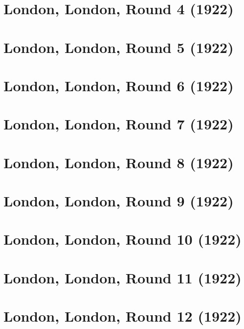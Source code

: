 \documentclass[11pt]{article}
\begin{document}
\clearpage

\section{London, London, Round 4 (1922)}


\clearpage

\section{London, London, Round 5 (1922)}


\clearpage

\section{London, London, Round 6 (1922)}


\clearpage

\section{London, London, Round 7 (1922)}


\clearpage

\section{London, London, Round 8 (1922)}


\clearpage

\section{London, London, Round 9 (1922)}


\clearpage

\section{London, London, Round 10 (1922)}


\clearpage

\section{London, London, Round 11 (1922)}


\clearpage

\section{London, London, Round 12 (1922)}

\end{document}
